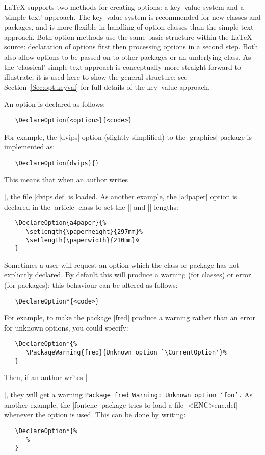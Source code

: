 \documentclass{ltxguide}
\begin{document}
\LaTeX{} supports two methods for creating options: a key--value system and a
`simple text' approach. The key--value system is recommended for new classes
and packages, and is more flexible in handling of option classes than the
simple text approach. Both option methods use the same basic structure within
the \LaTeX{} source: declaration of options first then processing options in a
second step. Both also allow options to be passed on to other packages or an
underlying class. As the `classical' simple text approach is conceptually more
straight-forward to illustrate, it is used here to show the general structure:
see Section~\ref{Sec:opt:keyval} for full details of the key--value approach.

An option is declared as follows:
\begin{verbatim}
   \DeclareOption{<option>}{<code>}
\end{verbatim}
For example, the |dvips| option (slightly simplified)
to the |graphics| package is implemented as:
\begin{verbatim}
   \DeclareOption{dvips}{}
\end{verbatim}
This means that when an author writes |\usepackage[dvips]{graphics}|, the file
|dvips.def| is loaded. As another example, the |a4paper| option is declared in
the |article| class to set the |\paperheight| and |\paperwidth| lengths:
\begin{verbatim}
   \DeclareOption{a4paper}{%
      \setlength{\paperheight}{297mm}%
      \setlength{\paperwidth}{210mm}%
   }
\end{verbatim}
Sometimes a user will request an option which the class or package has not
explicitly declared. By default this will produce a warning (for classes) or
error (for packages); this behaviour can be altered as follows:
\begin{verbatim}
   \DeclareOption*{<code>}
\end{verbatim}
For example, to make the package |fred| produce a warning rather than an error
for unknown options, you could specify:
\begin{verbatim}
   \DeclareOption*{%
      \PackageWarning{fred}{Unknown option `\CurrentOption'}%
   }
\end{verbatim}
Then, if an author writes |\usepackage[foo]{fred}|, they will get a warning
\texttt{Package fred Warning: Unknown option `foo'.} As another example, the
|fontenc| package tries to load a file |<ENC>enc.def| whenever the 
option is used. This can be done by writing:
\begin{verbatim}
   \DeclareOption*{%
      %
   }
\end{verbatim}
\end{document}
